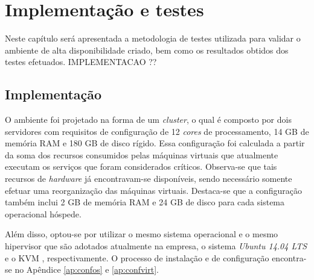 \chapter{Implementação e testes}
\label{cap:implementacaoresultados}

Neste capítulo será apresentada a metodologia de testes utilizada para validar o ambiente de alta disponibilidade criado, bem como os
resultados obtidos dos testes efetuados.
IMPLEMENTACAO ??

\section{Implementação}
\label{section:implementacao}


O ambiente foi projetado na forma de um \textit{cluster}, o qual é composto por dois servidores com requisitos de configuração 
de 12 \textit{cores} de processamento, 14 GB de memória \ac{RAM} e 180 GB de disco rígido.
Essa configuração foi calculada a partir da soma dos recursos consumidos pelas máquinas virtuais que atualmente executam os serviços que foram 
considerados críticos. Observa-se que tais recursos de \textit{hardware} já encontravam-se disponíveis, sendo necessário somente efetuar uma 
reorganização das máquinas virtuais. Destaca-se que a configuração também inclui 2 GB de memória \ac{RAM} e 24 GB de disco para cada sistema 
operacional hóspede.

Além disso, optou-se por utilizar o mesmo sistema operacional e o mesmo hipervisor que são adotados atualmente na empresa, o sistema 
\textit{Ubuntu 14.04 \ac{LTS}} e o \ac{KVM} \cite{kvm}, respectivamente. O processo de instalação e de configuração encontra-se no 
Apêndice \ref{ap:confos} e \ref{ap:confvirt}.

